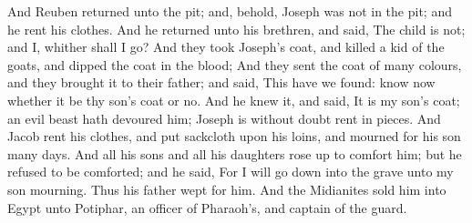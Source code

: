 \begin{biblechapter}
\verse And Reuben returned unto the pit; and, behold, Joseph was not in the pit; and he rent his clothes.
\verse And he returned unto his brethren, and said, The child is not; and I, whither shall I go?
\verse And they took Joseph's coat, and killed a kid of the goats, and dipped the coat in the blood;
\verse And they sent the coat of many colours, and they brought it to their father; and said, This have we found: know now whether it be thy son's coat or no.
\verse And he knew it, and said, It is my son's coat; an evil beast hath devoured him; Joseph is without doubt rent in pieces.
\verse And Jacob rent his clothes, and put sackcloth upon his loins, and mourned for his son many days.
\verse And all his sons and all his daughters rose up to comfort him; but he refused to be comforted; and he said, For I will go down into the grave unto my son mourning. Thus his father wept for him.
\verse And the Midianites sold him into Egypt unto Potiphar, an officer of Pharaoh's, and captain of the guard.
\end{biblechapter}

